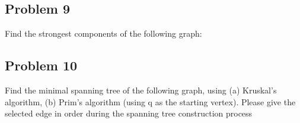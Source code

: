 \documentclass[a4paper]{article}
\makeatletter
\newenvironment{solution}
  {\begin{proof}[Solution]}
  {\end{proof}}
\renewenvironment{proof}[1][\proofname]{%
  \par\pushQED{\qed}\normalfont%
  \topsep6\p@\@plus6\p@\relax
  \trivlist\item[\hskip\labelsep\bfseries#1\@addpunct{.}]%
  \ignorespaces
}{%
  \popQED\endtrivlist\@endpefalse
}
\makeatother
\begin{document}
\subsection*{Problem 9}
Find the strongest components of the following graph:
\begin{solution}
\end{solution}

\subsection*{Problem 10}
Find the minimal spanning tree of the following graph, using (a) Kruskal’s algorithm, (b) Prim’s algorithm (using q as the starting vertex). Please give the selected edge in order during the spanning tree construction process
\begin{solution}
\end{solution}
\end{document}
